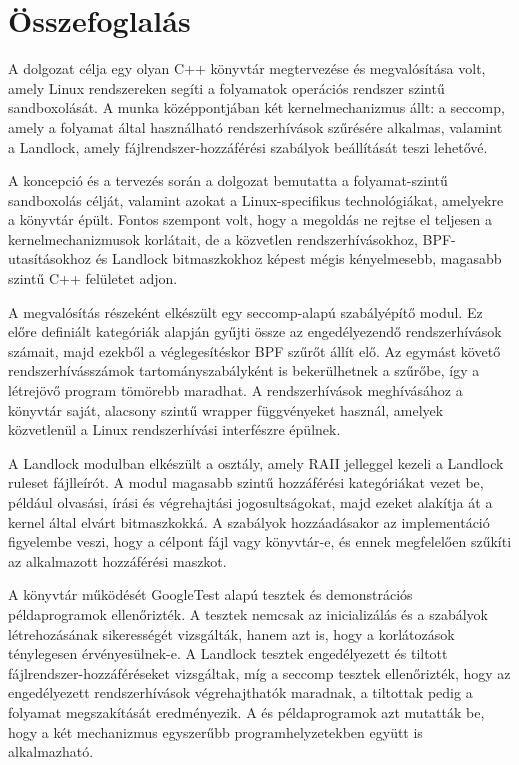 \chapter{Összefoglalás}

A dolgozat célja egy olyan C++ könyvtár megtervezése és megvalósítása volt,
amely Linux rendszereken segíti a folyamatok operációs rendszer szintű
sandboxolását. A munka középpontjában két kernelmechanizmus állt: a seccomp,
amely a folyamat által használható rendszerhívások szűrésére alkalmas, valamint
a Landlock, amely fájlrendszer-hozzáférési szabályok beállítását teszi
lehetővé.

A koncepció és a tervezés során a dolgozat bemutatta a folyamat-szintű
sandboxolás célját, valamint azokat a Linux-specifikus technológiákat, amelyekre
a könyvtár épült. Fontos szempont volt, hogy a megoldás ne rejtse el teljesen a
kernelmechanizmusok korlátait, de a közvetlen rendszerhívásokhoz,
BPF-utasításokhoz és Landlock bitmaszkokhoz képest mégis kényelmesebb,
magasabb szintű C++ felületet adjon.

A megvalósítás részeként elkészült egy seccomp-alapú szabályépítő modul. Ez
előre definiált kategóriák alapján gyűjti össze az engedélyezendő
rendszerhívások számait, majd ezekből a véglegesítéskor BPF szűrőt állít elő.
Az egymást követő rendszerhívásszámok tartományszabályként is bekerülhetnek a
szűrőbe, így a létrejövő program tömörebb maradhat. A rendszerhívások
meghívásához a könyvtár saját, alacsony szintű wrapper függvényeket használ,
amelyek közvetlenül a Linux rendszerhívási interfészre épülnek.

A Landlock modulban elkészült a  osztály, amely RAII
jelleggel kezeli a Landlock ruleset fájlleírót. A modul magasabb szintű
hozzáférési kategóriákat vezet be, például olvasási, írási és végrehajtási
jogosultságokat, majd ezeket alakítja át a kernel által elvárt bitmaszkokká. A
szabályok hozzáadásakor az implementáció figyelembe veszi, hogy a célpont fájl
vagy könyvtár-e, és ennek megfelelően szűkíti az alkalmazott hozzáférési
maszkot.

A könyvtár működését GoogleTest alapú tesztek és demonstrációs példaprogramok
ellenőrizték. A tesztek nemcsak az inicializálás és a szabályok létrehozásának
sikerességét vizsgálták, hanem azt is, hogy a korlátozások ténylegesen
érvényesülnek-e. A Landlock tesztek engedélyezett és tiltott
fájlrendszer-hozzáféréseket vizsgáltak, míg a seccomp tesztek ellenőrizték,
hogy az engedélyezett rendszerhívások végrehajthatók maradnak, a tiltottak
pedig a folyamat megszakítását eredményezik. A  és
 példaprogramok azt mutatták be, hogy a két
mechanizmus egyszerűbb programhelyzetekben együtt is alkalmazható.

